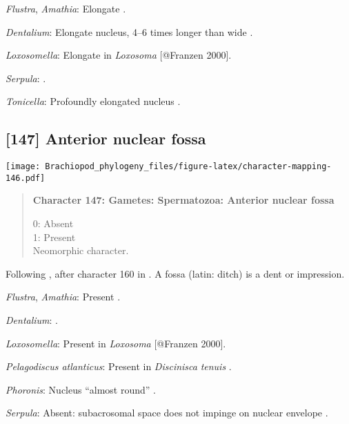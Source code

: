 \documentclass[openany]{book}
\theoremstyle{definition}
\theoremstyle{definition}
\theoremstyle{definition}
\theoremstyle{remark}
\begin{document}
\hypertarget{Amathia-coding-146}{}
\emph{Flustra}, \emph{Amathia}: Elongate \citep{Franzen1981}.

\hypertarget{Dentalium-coding-146}{}
\emph{Dentalium}: Elongate nucleus, 4--6 times longer than wide
\citep{DufresneDube1983}.

\hypertarget{Loxosomella-coding-146}{}
\emph{Loxosomella}: Elongate in \emph{Loxosoma} {[}@Franzen 2000{]}.

\hypertarget{Serpula-coding-146}{}
\emph{Serpula}: \citet{Gherardi2011}.

\hypertarget{Tonicella-coding-146}{}
\emph{Tonicella}: Profoundly elongated nucleus
\citep{BucklandNicks1988}.

\subsection*{{[}147{]} Anterior nuclear
fossa}\label{anterior-nuclear-fossa}

\texttt{[image: Brachiopod\_phylogeny\_files/figure-latex/character-mapping-146.pdf]}

\begin{quote}
\textbf{Character 147: Gametes: Spermatozoa: Anterior nuclear fossa}

0: Absent\\
1: Present\\
Neomorphic character.
\end{quote}

Following \citet{Smith2012}, after character 160 in \citet{Giribet2002}.
A fossa (latin: ditch) is a dent or impression.

\hypertarget{Amathia-coding-147}{}
\emph{Flustra}, \emph{Amathia}: Present \citep[in
\emph{Tubulipora};][]{Franzen1984}.

\hypertarget{Dentalium-coding-147}{}
\emph{Dentalium}: \citet{DufresneDube1983}.

\hypertarget{Loxosomella-coding-147}{}
\emph{Loxosomella}: Present in \emph{Loxosoma} {[}@Franzen 2000{]}.

\hypertarget{Pelagodiscus_atlanticus-coding-147}{}
\emph{Pelagodiscus atlanticus}: Present in \emph{Discinisca}
\emph{tenuis} \citep{Hodgson1994Ultrastructureof}.

\hypertarget{Phoronis-coding-147}{}
\emph{Phoronis}: Nucleus ``almost round''
\citep{Reunov2004Ultrastructuralstudy}.

\hypertarget{Serpula-coding-147}{}
\emph{Serpula}: Absent: subacrosomal space does not impinge on nuclear
envelope \citep{Gherardi2011}.
\end{document}
